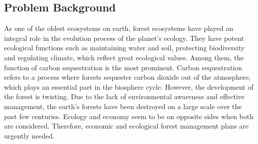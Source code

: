 \subsection{Problem Background}

As one of the oldest ecosystems on earth, forest ecosystems have played an integral role in the evolution process of the planet's ecology. They have potent ecological functions such as maintaining water and soil, protecting biodiversity and regulating climate, which reflect great ecological values. Among them, the function of carbon sequestration is the most prominent. Carbon sequestration refers to a process where forests sequester carbon dioxide out of the atmosphere, which plays an essential part in the biosphere cycle. However, the development of the forest is twisting. Due to the lack of environmental awareness and effective management, the earth's forests have been destroyed on a large scale over the past few centuries. Ecology and economy seem to be on opposite sides when both are considered. Therefore, economic and ecological forest management plans are urgently needed.







